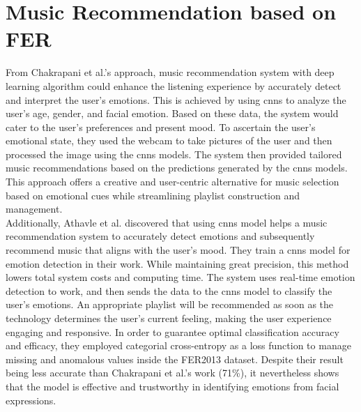 \section{Music Recommendation based on FER}
From Chakrapani et al.'s approach, music recommendation system with deep learning algorithm could enhance the listening experience by accurately detect and interpret the user's emotions.
This is achieved by using \gls{cnns} to analyze the user's age, gender, and facial emotion. Based on these data, the system would cater to the user's preferences and present mood.
To ascertain the user's emotional state, they used the webcam to take pictures of the user and then processed the image using the \gls{cnns} models.
The system then provided tailored music recommendations based on the predictions generated by the \gls{cnns} models. 
This approach offers a creative and user-centric alternative for music selection based on emotional cues while streamlining playlist construction and management.\cite{mrchakrapanids_2023_music}
\\
\indent Additionally, Athavle et al. discovered that using \gls{cnns} model helps a music recommendation system to accurately detect emotions and subsequently recommend music that aligns with the user's mood.
They train a \gls{cnns} model for emotion detection in their work. 
While maintaining great precision, this method lowers total system costs and computing time.
The system uses real-time emotion detection to work, and then sends the data to the \gls{cnns} model to classify the user's emotions. 
An appropriate playlist will be recommended as soon as the technology determines the user's current feeling, making the user experience engaging and responsive.
In order to guarantee optimal classification accuracy and efficacy, they employed categorial cross-entropy as a loss function to manage missing and anomalous values inside the FER2013 dataset.
Despite their result being less accurate than Chakrapani et al.'s work (71\%), it nevertheless shows that the model is effective and trustworthy in identifying emotions from facial expressions. \cite{athavle_2021_music}
